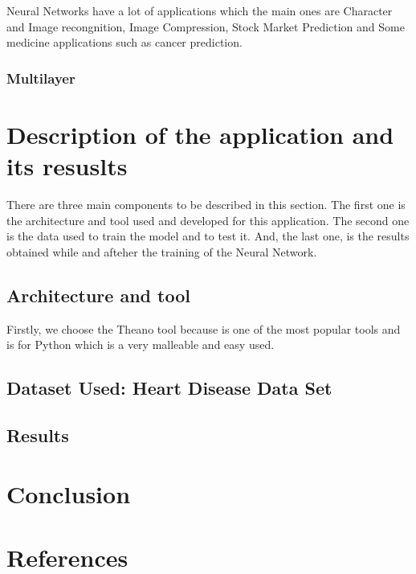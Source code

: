 \documentclass[12pt]{article}
\begin{document}
Neural Networks have a lot of applications which the main ones are Character and Image recongnition, Image Compression, Stock Market Prediction and Some medicine applications such as cancer prediction.
\subsubsection{Multilayer}

\section{Description of the application and its resuslts}

There are three main components to be described in this section. The first one is the architecture and tool used and developed for this application. The second one is the data used to train the model and to test it. And, the last one, is the results obtained while and afteher the training of the Neural Network.

\subsection{Architecture and tool}

Firstly, we choose the Theano tool because is one of the most popular tools and is for Python which is a very malleable and easy used.

\subsection{Dataset Used: Heart Disease Data Set \cite{Lichman:2013}}

\subsection{Results}

\section{Conclusion}

\section{References}



\end{document}
